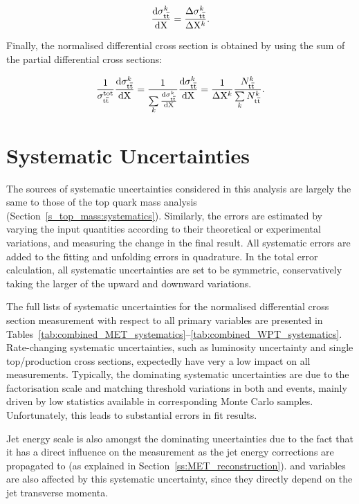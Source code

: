 \begin{equation}
\label{eq:differential_xsection}
\frac{\mathrm{d}\sigma_{\mathrm{t}\overline{\mathrm{t}}}^k}{\mathrm{d} \mathrm{X}} = \frac{\Delta\sigma_{\mathrm{t}\overline{\mathrm{t}}}^k}{\Delta \mathrm{X}^k }.
\end{equation}

Finally, the normalised differential cross section is obtained by using the sum of the partial differential cross
sections:

\begin{equation}
\label{eq:normalised_differential_xsection}
\frac{1}{\sigma_{\mathrm{t}\overline{\mathrm{t}}}^\mathrm{tot}} \frac{\mathrm{d}\sigma_{\mathrm{t}\overline{\mathrm{t}}}^k}{\mathrm{d} \mathrm{X}} =
\frac{1}{\sum\limits_k{\frac{\mathrm{d}\sigma_{\mathrm{t}\overline{\mathrm{t}}}^k}{\mathrm{d} \mathrm{X}}}} \frac{\mathrm{d}\sigma_{\mathrm{t}\overline{\mathrm{t}}}^k}{\mathrm{d}
\mathrm{X}} = \frac{1}{\Delta \mathrm{X}^k} \frac{N_{\mathrm{t}\overline{\mathrm{t}}}^k}{\sum\limits_k N_{\mathrm{t}\overline{\mathrm{t}}}^k}.
\end{equation}

\section{Systematic Uncertainties}
\label{s_xsection:systematics}
The sources of systematic uncertainties considered in this analysis are largely the same to those of the top quark mass
analysis (Section~\ref{s_top_mass:systematics}). Similarly, the errors are estimated by varying the input quantities
according to their theoretical or experimental variations, and measuring the change in the final result. All systematic
errors are added to the fitting and unfolding errors in quadrature. In the total error calculation, all systematic
uncertainties are set to be symmetric, conservatively taking the larger of the upward and downward variations.

The full lists of systematic uncertainties for the normalised differential cross section measurement with respect to all
primary variables are presented in Tables~\ref{tab:combined_MET_systematics}--\ref{tab:combined_WPT_systematics}.
Rate-changing systematic uncertainties, such as luminosity uncertainty and single top/\ttbar production cross sections,
expectedly have very a low impact on all measurements. Typically, the dominating systematic uncertainties are due to the
factorisation scale and matching threshold variations in both \VpJets and \ttbar events, mainly driven by low statistics
available in corresponding Monte Carlo samples. Unfortunately, this leads to substantial errors in fit results.

Jet energy scale is also amongst the dominating uncertainties due to the fact that it has a direct influence on the \MET
measurement as the jet energy corrections are propagated to \MET (as explained in Section~\ref{ss:MET_reconstruction}).
\HT and \ST variables are also affected by this systematic uncertainty, since they directly depend on the jet transverse
momenta.

